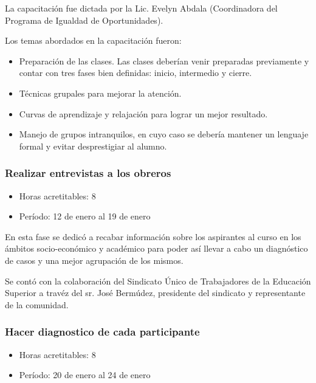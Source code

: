              La capacitación fue dictada por la Lic. Evelyn Abdala (Coordinadora del Programa de Igualdad de
             Oportunidades).
             
             Los temas abordados en la capacitación fueron:
             
             \begin{itemize}
                 \item Preparación de las clases. Las clases deberían venir preparadas previamente y contar con tres fases bien definidas: inicio, intermedio y cierre.
                 
                 \item Técnicas grupales para mejorar la atención.
                 
                 \item Curvas de aprendizaje y relajación para lograr un mejor resultado.
                 
                 \item Manejo de grupos intranquilos, en cuyo caso se debería mantener un lenguaje formal y evitar desprestigiar al alumno.
                 
                \end{itemize}
             
             \subsubsection {Realizar entrevistas a los obreros}
             \begin{itemize}
                 \item Horas acretitables: 8
                 \item Período: 12 de enero al 19 de enero
                \end{itemize}
             
             En esta fase se dedicó a recabar información sobre los aspirantes al curso en los ámbitos socio-económico y académico para poder así llevar a cabo un diagnóstico de casos y una mejor agrupación de los mismos.
             
             Se contó con la colaboración del Sindicato Único de Trabajadores de la Educación Superior a travéz del sr. José Bermúdez, presidente del sindicato y representante de la comunidad.
             
             \subsubsection {Hacer diagnostico de cada participante}
             \begin{itemize}
                 \item Horas acretitables: 8
                 \item Período: 20 de enero al 24 de enero
                \end{itemize}
                

